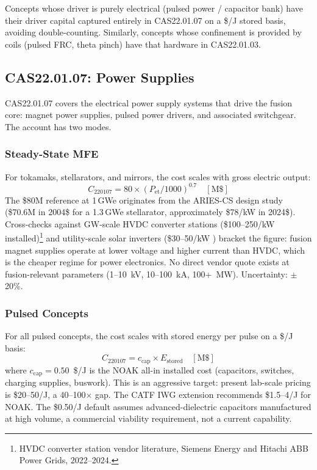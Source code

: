 \documentclass{article}
\begin{document}
Concepts whose driver is purely electrical (pulsed power / capacitor
bank) have their driver capital captured entirely in CAS22.01.07 on a
\$/J stored basis, avoiding double-counting.  Similarly, concepts
whose confinement is provided by coils (pulsed FRC, theta pinch) have
that hardware in CAS22.01.03.

\subsection{CAS22.01.07: Power Supplies}
\label{sec:cas2207}

CAS22.01.07 covers the electrical power supply systems that drive the
fusion core: magnet power supplies, pulsed power drivers, and associated
switchgear.  The account has two modes.

\subsubsection{Steady-State MFE}
For tokamaks, stellarators, and mirrors, the cost scales with gross
electric output:
\begin{equation}
  C_{220107} = 80 \times (P_{\text{et}} / 1000)^{0.7} \quad [\text{M\$}]
\end{equation}
The \$80M reference at 1\,GWe originates from the ARIES-CS design study
(\$70.6M in 2004\$ for a 1.3\,GWe stellarator, approximately \$78/kW in
2024\$).  Cross-checks against GW-scale HVDC converter stations
(\$100--250/kW installed)\footnote{HVDC converter station vendor literature, Siemens Energy and Hitachi ABB Power Grids, 2022--2024.} and utility-scale solar inverters
(\$30--50/kW \citep{nrel_atb2024}) bracket the figure: fusion magnet supplies
operate at lower voltage and higher current than HVDC, which is the
cheaper regime for power electronics.  No direct vendor quote exists at
fusion-relevant parameters (1--10~kV, 10--100~kA, 100+~MW).
Uncertainty: $\pm$20\%.

\subsubsection{Pulsed Concepts}
For all pulsed concepts, the cost scales with stored energy per
pulse on a \$/J basis:
\begin{equation}
  C_{220107} = c_{\text{cap}} \times E_{\text{stored}} \quad [\text{M\$}]
\end{equation}
where $c_{\text{cap}} = 0.50$~\$/J is the NOAK all-in installed cost
(capacitors, switches, charging supplies, buswork).  This is an
aggressive target: present lab-scale pricing is \$20--50/J, a 40--100$\times$
gap.  The CATF IWG extension \citep{woodruff2026b} recommends
\$1.5--4/J for NOAK.  The \$0.50/J default assumes advanced-dielectric
capacitors manufactured at high volume, a commercial viability
requirement, not a current capability.
\end{document}
